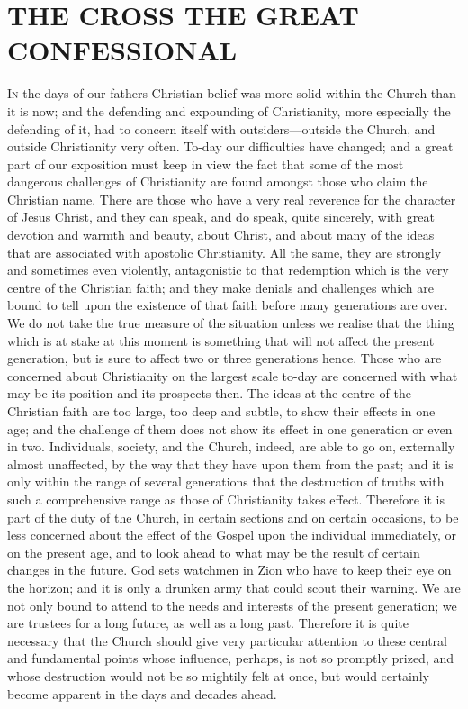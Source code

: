 \documentclass[12pt,letterpaper,oneside]{book}
\begin{document}
\chapter{THE CROSS THE GREAT 
CONFESSIONAL} 



\textsc{In} the days of our fathers Christian belief 
was more solid within the Church than it 
is now; and the defending and expounding of 
Christianity, more especially the defending of 
it, had to concern itself with outsiders---outside 
the Church, and outside Christianity very often. 
To-day our difficulties have changed; and a 
great part of our exposition must keep in view 
the fact that some of the most dangerous challenges 
of Christianity are found amongst those 
who claim the Christian name. There are those 
who have a very real reverence for the character 
of Jesus Christ, and they can speak, and 
do speak, quite sincerely, with great devotion 
and warmth and beauty, about Christ, and 
about many of the ideas that are associated 
with apostolic Christianity. All the same, they 
are strongly and sometimes even violently, 
antagonistic to that redemption which is the 
very centre of the Christian faith; and they 
make denials and challenges which are bound 
to tell upon the existence of that faith before 
many generations are over. We do not take 
the true measure of the situation unless we 
realise that the thing which is at stake at this 
moment is something that will not affect the 
present generation, but is sure to affect two or 
three generations hence. Those who are concerned 
about Christianity on the largest scale 
to-day are concerned with what may be its 
position and its prospects then. The ideas at 
the centre of the Christian faith are too large, 
too deep and subtle, to show their effects 
in one age; and the challenge of them does 
not show its effect in one generation or even 
in two. Individuals, society, and the Church, 
indeed, are able to go on, externally almost unaffected, 
by the way that they have upon them 
from the past; and it is only within the range 
of several generations that the destruction of 
truths with such a comprehensive range as 
those of Christianity takes effect. Therefore it 
is part of the duty of the Church, in certain 
sections and on certain occasions, to be less 
concerned about the effect of the Gospel upon 
the individual immediately, or on the present 
age, and to look ahead to what may be the 
result of certain changes in the future. God 
sets watchmen in Zion who have to keep their 
eye on the horizon; and it is only a drunken 
army that could scout their warning. We are 
not only bound to attend to the needs and 
interests of the present generation; we are 
trustees for a long future, as well as a long 
past. Therefore it is quite necessary that the 
Church should give very particular attention 
to these central and fundamental points whose 
influence, perhaps, is not so promptly prized, 
and whose destruction would not be so mightily 
felt at once, but would certainly become apparent 
in the days and decades ahead. 
\end{document}
